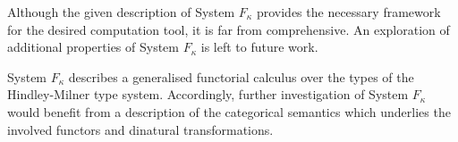 \documentclass[../../Dissertation.tex]{subfiles}
\begin{document}
\begin{remark}
Although the given description of System $F_\kappa$ provides the necessary framework for the desired computation tool, it is far from comprehensive. An exploration of additional properties of System $F_\kappa$ is left to future work.
\par
System $F_\kappa$ describes a  generalised functorial calculus over the types of the Hindley-Milner type system. Accordingly, further investigation of System $F_\kappa$ would benefit from a description of the categorical semantics which underlies the involved functors and dinatural transformations.
\end{remark}
\end{document}
